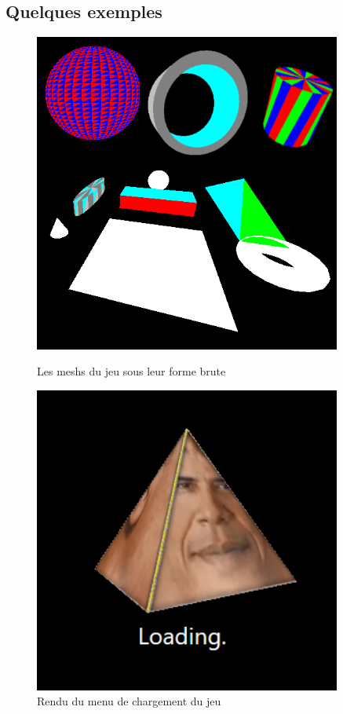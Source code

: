 \subsection{Quelques exemples}
\begin{figure}[htbp]
    \centering
    \begin{minipage}{0.45\textwidth}
        \centering
        \includegraphics[width=0.9\textwidth]{images/GraphicAllMesh.png}
        \caption{Les meshs du jeu sous leur forme brute} 
    \end{minipage}%
    \hfill
    \begin{minipage}{0.45\textwidth}
        \centering
        \includegraphics[width=0.9\textwidth]{images/GraphicLoadingScreen.png}
        \caption{Rendu du menu de chargement du jeu}
    \end{minipage}
    

\end{figure}
